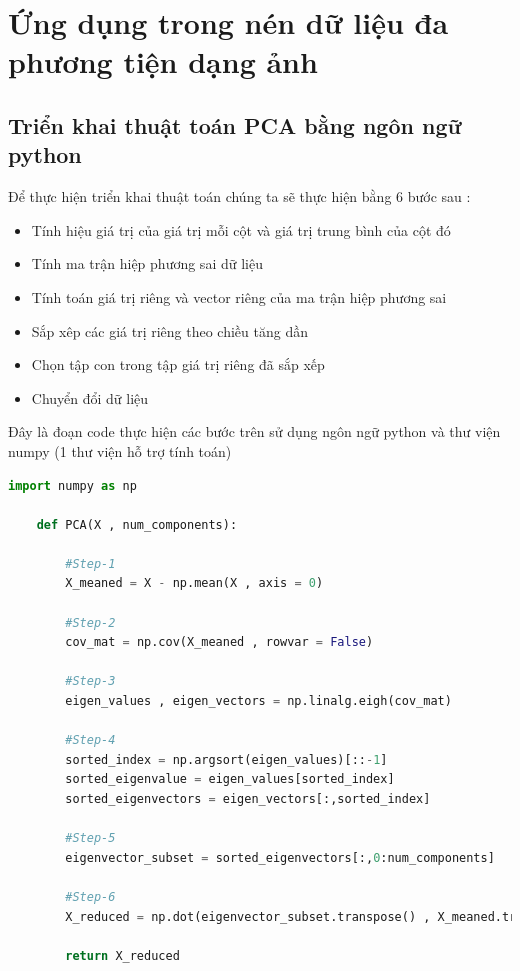 \section{Ứng dụng trong nén dữ liệu đa phương tiện dạng ảnh}
\subsection{Triển khai thuật toán PCA bằng ngôn ngữ python}

Để thực hiện triển khai thuật toán chúng ta sẽ thực hiện bằng 6 bước sau :

\begin{itemize}
    \item Tính hiệu giá trị của giá trị mỗi cột và giá trị trung bình của cột đó
    \item Tính ma trận hiệp phương sai dữ liệu
    \item Tính toán giá trị riêng và vector riêng của ma trận hiệp phương sai
    \item Sắp xêp các giá trị riêng theo chiều tăng dần
    \item Chọn tập con trong tập giá trị riêng đã sắp xếp
    \item Chuyển đổi dữ liệu
\end{itemize}

\newpage
Đây là đoạn code thực hiện các bước trên sử dụng ngôn ngữ python và thư viện numpy (1 thư viện hỗ trợ tính toán)
\begin{lstlisting}[language=Python]
    import numpy as np
 
    def PCA(X , num_components):
        
        #Step-1
        X_meaned = X - np.mean(X , axis = 0)
        
        #Step-2
        cov_mat = np.cov(X_meaned , rowvar = False)
        
        #Step-3
        eigen_values , eigen_vectors = np.linalg.eigh(cov_mat)
        
        #Step-4
        sorted_index = np.argsort(eigen_values)[::-1]
        sorted_eigenvalue = eigen_values[sorted_index]
        sorted_eigenvectors = eigen_vectors[:,sorted_index]
        
        #Step-5
        eigenvector_subset = sorted_eigenvectors[:,0:num_components]
        
        #Step-6
        X_reduced = np.dot(eigenvector_subset.transpose() , X_meaned.transpose() ).transpose()
        
        return X_reduced
    
\end{lstlisting}

